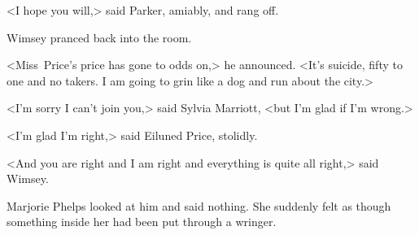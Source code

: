 <I hope you will,> said Parker, amiably, and rang off.

Wimsey pranced back into the room.

<Miss~Price's price has gone to odds on,> he announced. <It's suicide, fifty to one and no takers. I am going to grin like a dog and run about the city.>

<I'm sorry I can't join you,> said Sylvia Marriott, <but I'm glad if I'm wrong.>

<I'm glad I'm right,> said Eiluned Price, stolidly.

<And you are right and I am right and everything is quite all right,> said Wimsey.

Marjorie Phelps looked at him and said nothing. She suddenly felt as though something inside her had been put through a wringer.